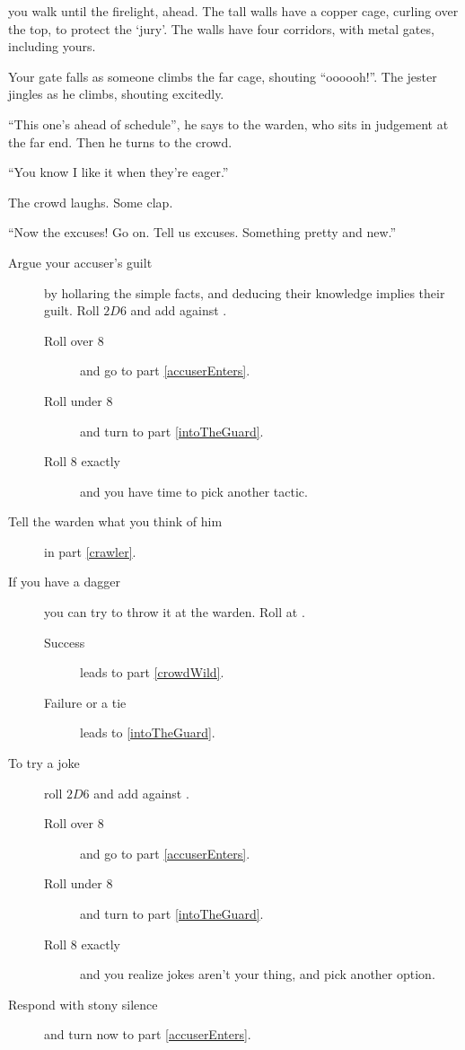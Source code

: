 you walk until the firelight, ahead.
The tall walls have a copper cage, curling over the top, to protect the `jury'.
The walls have four corridors, with metal gates, including yours.

Your gate falls as someone climbs the far cage, shouting ``oooooh!''.
The jester jingles as he climbs, shouting excitedly.

``This one's ahead of schedule'', he says to the \gls{warden}, who sits in judgement at the far end.
Then he turns to the crowd.

``You know I like it when they're eager.''

The crowd laughs.
Some clap.

``Now the excuses!
Go on.
Tell us excuses.
Something pretty and new.''

\begin{description}
  \item[Argue your accuser's guilt]
  by hollaring the simple facts, and deducing their knowledge implies their guilt.
  Roll $2D6$ and add  against \tn[8].
  \begin{description}
    \item[Roll over 8]
    and go to part \vref{accuserEnters}.
    \item[Roll under 8]
    and turn to part \vref{intoTheGuard}.
    \item[Roll 8 exactly]
    and you have time to pick another tactic.
  \end{description}
  \item[Tell the \gls{warden} what you think of him]
  in part \vref{crawler}.
  \item[If you have a dagger]
  you can try to throw it at the \gls{warden}.
  Roll  at \tn[11].
  \begin{description}
    \item[Success]
    leads to part \vref{crowdWild}.
    \item[Failure or a tie]
    leads to \vref{intoTheGuard}.
  \end{description}
  \item[To try a joke]
  roll $2D6$ and add  against \tn[8].
  \begin{description}
    \item[Roll over 8]
    and go to part \vref{accuserEnters}.
    \item[Roll under 8]
    and turn to part \vref{intoTheGuard}.
    \item[Roll 8 exactly]
    and you realize jokes aren't your thing, and pick another option.
  \end{description}
  \item[Respond with stony silence]
  and turn now to part \vref{accuserEnters}.
\end{description}


